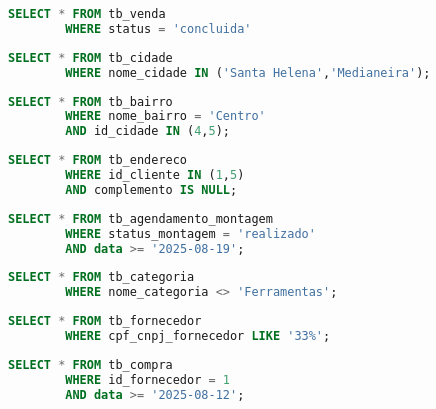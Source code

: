\documentclass[
12pt,
a4paper,
semrecuonosumario,
sumario = abnt-6027-2012]{report}
\begin{document}
    \begin{lstlisting}[language=SQL,caption={SELECT -- Tabela \texttt{tb\_venda}}]
        SELECT * FROM tb_venda
        WHERE status = 'concluida'
    \end{lstlisting}
    
    \begin{lstlisting}[language=SQL,caption={SELECT -- Tabela \texttt{tb\_cidade}}]
        SELECT * FROM tb_cidade
        WHERE nome_cidade IN ('Santa Helena','Medianeira');
    \end{lstlisting}
    
    \begin{lstlisting}[language=SQL,caption={SELECT -- Tabela \texttt{tb\_bairro}}]
        SELECT * FROM tb_bairro
        WHERE nome_bairro = 'Centro'
        AND id_cidade IN (4,5);
    \end{lstlisting}
    
    \begin{lstlisting}[language=SQL,caption={SELECT -- Tabela \texttt{tb\_endereco}}]
        SELECT * FROM tb_endereco
        WHERE id_cliente IN (1,5)
        AND complemento IS NULL;
    \end{lstlisting}
    
    \begin{lstlisting}[language=SQL,caption={SELECT -- Tabela \texttt{tb\_agendamento\_montagem}}]
        SELECT * FROM tb_agendamento_montagem
        WHERE status_montagem = 'realizado'
        AND data >= '2025-08-19';
    \end{lstlisting}
    
    \begin{lstlisting}[language=SQL,caption={SELECT -- Tabela \texttt{tb\_categoria}}]
        SELECT * FROM tb_categoria
        WHERE nome_categoria <> 'Ferramentas';
    \end{lstlisting}
    
    \begin{lstlisting}[language=SQL,caption={SELECT -- Tabela \texttt{tb\_fornecedor}}]
        SELECT * FROM tb_fornecedor
        WHERE cpf_cnpj_fornecedor LIKE '33%';
    \end{lstlisting}
    
    \begin{lstlisting}[language=SQL,caption={SELECT -- Tabela \texttt{tb\_compra}}]
        SELECT * FROM tb_compra
        WHERE id_fornecedor = 1
        AND data >= '2025-08-12';
    \end{lstlisting}
    
\end{document}
